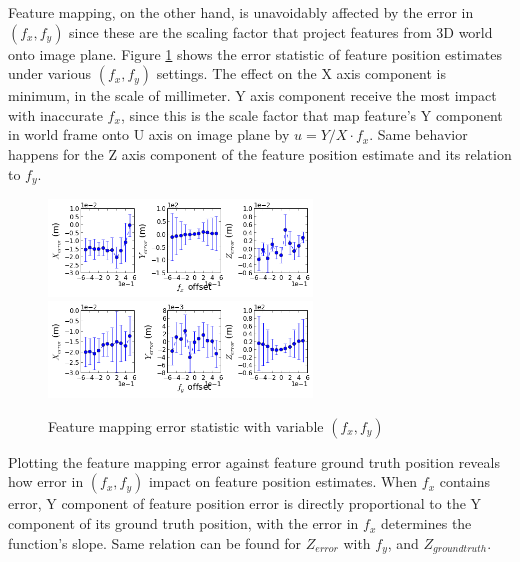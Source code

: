 Feature mapping, on the other hand, is unavoidably affected by the
error in $(f_x, f_y)$ since these are the scaling factor that project
features from 3D world onto image plane. Figure \ref{fig:simfig38-39}
shows the error statistic of feature position estimates under various
$(f_x, f_y)$ settings. The effect on the X axis component is minimum,
in the scale of millimeter. Y axis component receive the most impact
with inaccurate $f_x$, since this is the scale factor that map
feature's Y component in world frame onto U axis on image plane by $u
= Y/X \cdot f_x$. Same behavior happens for the Z axis component of
the feature position estimate and its relation to $f_y$.
\begin{figure}[h]
  \centering
  \includegraphics[width=7cm,keepaspectratio=true]{./Figures/SimulationFigures/Figure38.png}
  \includegraphics[width=7cm,keepaspectratio=true]{./Figures/SimulationFigures/Figure39.png}
  \caption{Feature mapping error statistic with variable $(f_x, f_y)$}
  \label{fig:simfig38-39}
\end{figure}

Plotting the feature mapping error against feature ground truth
position reveals how error in $(f_x, f_y)$ impact on feature
position estimates. When $f_x$ contains error, Y component of
feature position error is  directly proportional
to the Y component of its ground truth position, with the error in
$f_x$ determines the function's slope. Same relation can be found for
$Z_{error}$ with $f_y$, and $Z_{ground truth}$.

